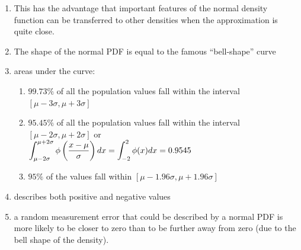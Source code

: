 \begin{enumerate}
    \item This has the advantage that important features of the normal density function can be transferred to other densities when the approximation is quite close.
    \hfill \cite{statistics/book/Statistics-for-Data-Scientists/Maurits-Kaptein}

    \item The shape of the normal PDF is equal to the famous “bell-shape” curve
    \hfill \cite{statistics/book/Statistics-for-Data-Scientists/Maurits-Kaptein}

    \item areas under the curve:
    \begin{enumerate}
        \item $99.73\%$ of all the population values fall within the interval $[\mu - 3\sigma, \mu + 3\sigma]$
        \hfill \cite{statistics/book/Statistics-for-Data-Scientists/Maurits-Kaptein}

        \item $95.45\%$ of all the population values fall within the interval $[\mu - 2\sigma, \mu + 2\sigma]$ or
        \hfill \cite{statistics/book/Statistics-for-Data-Scientists/Maurits-Kaptein}
        \\
        $
            \displaystyle\int_{\mu - 2\sigma}^{\mu + 2\sigma}
            \phi\left(\dfrac{x-\mu}{\sigma}\right) dx
            =
            \displaystyle\int_{-2}^{2}
            \phi(x) dx
            =
            0.9545
        $
        \hfill \cite{statistics/book/Statistics-for-Data-Scientists/Maurits-Kaptein}

        \item $95\%$ of the values fall within $[\mu - 1.96\sigma, \mu + 1.96\sigma]$
        \hfill \cite{statistics/book/Statistics-for-Data-Scientists/Maurits-Kaptein}
    \end{enumerate}

    \item  describes both positive and negative values
    \hfill \cite{statistics/book/Statistics-for-Data-Scientists/Maurits-Kaptein}

    \item a random measurement error that could be described by a normal PDF is more likely to be closer to zero than to be further away from zero (due to the bell shape of the density).
    \hfill \cite{statistics/book/Statistics-for-Data-Scientists/Maurits-Kaptein}
\end{enumerate}









